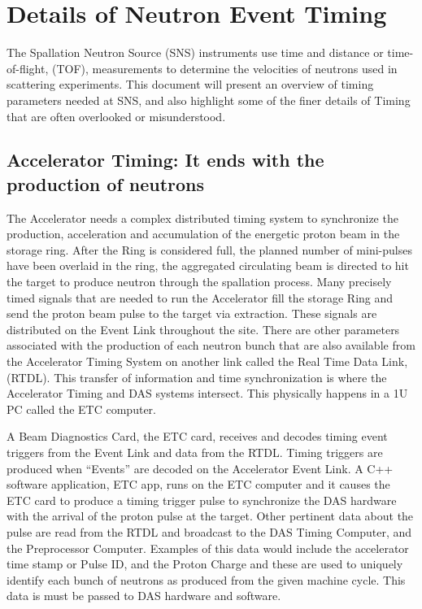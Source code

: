 \section {Details of Neutron Event Timing}
The Spallation Neutron Source (SNS) instruments use time and distance or time-of-flight, (TOF), measurements to determine the velocities of neutrons used in scattering experiments.  This document will present an overview of timing parameters needed at SNS, and also highlight some of the finer details of Timing that are often overlooked or misunderstood.

\subsection{Accelerator Timing: It ends with the production of neutrons}
The Accelerator needs a complex distributed timing system to synchronize the production, acceleration and accumulation of the energetic proton beam in the storage ring.  After the Ring is considered full, the planned number of mini-pulses have been overlaid in the ring, the aggregated circulating beam is directed to hit the target to produce neutron through the spallation process.  Many precisely timed signals that are needed to run the Accelerator fill the storage Ring and send the proton beam pulse to the target via extraction.  These signals are distributed on the Event Link throughout the site.  There are other parameters associated with the production of each neutron bunch that are also available from the Accelerator Timing System on another link called the Real Time Data Link, (RTDL).  This transfer of information and time synchronization is where the Accelerator Timing and DAS systems intersect.  This physically happens in a 1U PC called the ETC computer.

A Beam Diagnostics Card, the ETC card, receives and decodes timing event triggers from the Event Link and data from the RTDL.  Timing triggers are produced when ``Events'' are decoded on the Accelerator Event Link.  A C++ software application, ETC app,  runs on the ETC computer and it causes the ETC card to produce a timing trigger pulse to synchronize the DAS hardware with the arrival of the proton pulse at the target.   Other pertinent data about the pulse are read from the RTDL and broadcast to the DAS Timing Computer, and the Preprocessor Computer.  Examples of this data would include the accelerator time stamp or Pulse ID, and the Proton Charge and these are used to uniquely identify each bunch of neutrons as produced from the given machine cycle.  This data is must be passed to DAS hardware and software.

